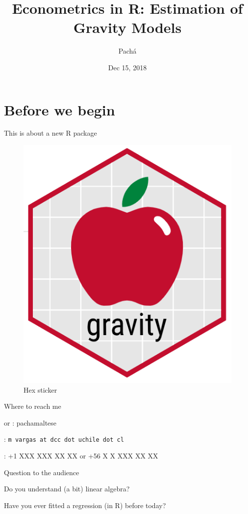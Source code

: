 \documentclass[ignorenonframetext,compress,aspectratio=169]{beamer}
\title{Econometrics in R: Estimation of Gravity Models}
\author{Pachá}
\institute{satRday Santiago}
\date{Dec 15, 2018}
\begin{document}
\frame{\titlepage}

\section{Before we begin}\label{before-we-begin}

\begin{frame}{This is about a new R package}

\begin{figure}
\centering
\includegraphics{hexicon.PNG}
\caption{Hex sticker}
\end{figure}

\end{frame}

\begin{frame}[fragile]{Where to reach me}

\faTwitter or \faGithub: pachamaltese

\faEnvelopeO: \texttt{m\ vargas\ at\ dcc\ dot\ uchile\ dot\ cl}

\faPhone: +1 XXX XXX XX XX or +56 X X XXX XX XX

\end{frame}

\begin{frame}{Question to the audience}

\LARGE{Do you understand (a bit) linear algebra?}

\LARGE{Have you ever fitted a regression (in R) before today?}

\end{frame}
\end{document}

